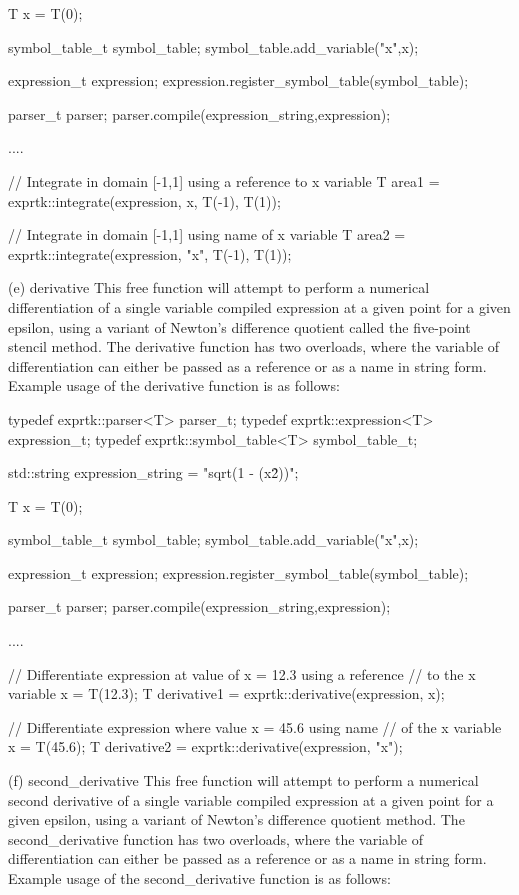 {T x = T(0);

symbol\_table\_t symbol\_table;
symbol\_table.add\_variable("x",x);

expression\_t expression;
expression.register\_symbol\_table(symbol\_table);

parser\_t parser;
parser.compile(expression\_string,expression);

....

// Integrate in domain [-1,1] using a reference to x variable
T area1 = exprtk::integrate(expression, x, T(-1), T(1));

// Integrate in domain [-1,1] using name of x variable
T area2 = exprtk::integrate(expression, "x", T(-1), T(1));


(e) derivative
This free function will attempt to perform a numerical differentiation
of a single variable compiled expression at a given point for a  given
epsilon, using a  variant of Newton's  difference quotient called  the
five-point stencil method. The derivative function has two  overloads,
where  the  variable of  differentiation  can either  be  passed as  a
reference or as a name in string form. Example usage of the derivative
function is as follows:

typedef exprtk::parser<T>             parser\_t;
typedef exprtk::expression<T>     expression\_t;
typedef exprtk::symbol\_table<T> symbol\_table\_t;

std::string expression\_string = "sqrt(1 - (x\^2))";

T x = T(0);

symbol\_table\_t symbol\_table;
symbol\_table.add\_variable("x",x);

expression\_t expression;
expression.register\_symbol\_table(symbol\_table);

parser\_t parser;
parser.compile(expression\_string,expression);

....

// Differentiate expression at value of x = 12.3 using a reference
// to the x variable
x = T(12.3);
T derivative1 = exprtk::derivative(expression, x);

// Differentiate expression where value x = 45.6 using name
// of the x variable
x = T(45.6);
T derivative2 = exprtk::derivative(expression, "x");


(f) second\_derivative
This  free  function  will  attempt  to  perform  a  numerical  second
derivative of a single variable  compiled expression at a given  point
for a given epsilon, using  a variant of Newton's difference  quotient
method. The second\_derivative function  has  two overloads, where  the
variable of differentiation can either be passed as a reference or  as
a name in string form. Example usage of the second\_derivative function
is as follows:

}
